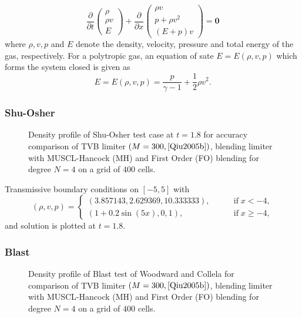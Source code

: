 \documentclass{beamer}
\newcommand{\tmmathbf}[1]{\ensuremath{\boldsymbol{#1}}}
\newcommand{\tmop}[1]{\ensuremath{\operatorname{#1}}}
\begin{document}
{{\begin{frame}
{{  
  \[ \frac{\partial}{\partial t} \left(\begin{array}{c}
       \rho\\
       \rho v\\
       E
     \end{array}\right) + \frac{\partial}{\partial x} \left(\begin{array}{c}
       \rho v\\
       p + \rho v^2\\
       (E + p) v
     \end{array}\right) =\tmmathbf{0} \]
  where $\rho, v, p$ and $E$ denote the density, velocity, pressure and total
  energy of the gas, respectively. For a polytropic gas, an equation of sate
  $E = E (\rho, v, p)$ which forms the system closed is given as
  \[ E = E (\rho, v, p) = \frac{p}{\gamma - 1} + \frac{1}{2} \rho v^2 . \]}}
\end{frame}}{\begin{frame}
  \frametitle{Shu-Osher}
  
  \begin{figure}[h]
    \caption{Density profile of Shu-Osher test case {\cite{Shu1989}} at $t =
    1.8$ for accuracy comparison of TVB limiter $\left( M = 300,
    \cite{Qiu2005b} \right)$, blending limiter with MUSCL-Hancock (MH) and
    First Order (FO) blending for degree $N = 4$ on a grid of $400$ cells.}
  \end{figure}
  
  Transmissive boundary conditions on $[- 5, 5]$ with
  \[ (\rho, v, p) = \left\{\begin{array}{lll}
       (3.857143, 2.629369, 10.333333), & \quad & \tmop{if} x < - 4,\\
       (1 + 0.2 \sin (5 x), 0, 1), &  & \tmop{if} x \geq - 4,
     \end{array}\right. \]
  and solution is plotted at $t = 1.8$.
\end{frame}}{\begin{frame}
  \frametitle{Blast}
  
  \begin{figure}[h]
    \caption{Density profile of Blast test of Woodward and Collela
    {\cite{Woodward1984}} for comparison of TVB limiter $\left( M = 300,
    \cite{Qiu2005b} \right)$, blending limiter with MUSCL-Hancock (MH) and
    First Order (FO) blending for degree $N = 4$ on a grid of $400$ cells.}
  \end{figure}
  

\end{frame}}}
\end{document}
